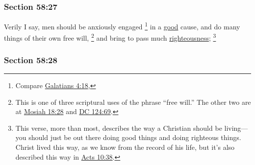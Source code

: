 
	\subsubsection{Section 58:27} %
		\label{DC58-27}

		Verily I say, men should be anxiously engaged%
			\footnote{%
				Compare \hyperref[GALATIANS-4-18]{Galatians 4:18},
				}
		in a \hyperref[GOODNESS]{good} cause, and do many things of their own free will,%
			\footnote{%
				This is one of three scriptural uses of the phrase ``free will.'' The other two are at \hyperref[MOSIAH-18-28]{Mosiah 18:28} and \hyperref[DC124-69]{DC 124:69}.
				}
		and bring to pass much \hyperref[RIGHTEOUSNESS]{righteousness};%
			\footnote{%
				This verse, more than most, describes the way a Christian should be living---you should just be out there doing good things and doing righteous things. Christ lived this way, as we know from the record of his life, but it's also described this way in \hyperref[ACTS-10-38]{Acts 10:38}.
				}


	\subsubsection{Section 58:28} %
		\label{DC58-28}

